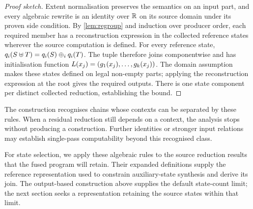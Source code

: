 \begin{proof}[Proof sketch]
Extent normalisation preserves the semantics on an input part, and every algebraic rewrite is an identity over $\mathbb{R}$ on its source domain under its proven side condition.
By \cref{lem:regroup} and induction over producer order, each required member has a reconstruction expression in the collected reference states wherever the source computation is defined.
For every reference state, $q_i(S\uplus T)=q_i(S)\oplus_i q_i(T)$.
The tuple therefore joins componentwise and has initialisation function $L(x_j)=(g_1(x_j),\dots,g_k(x_j))$.
The domain assumption makes these states defined on legal non-empty parts; applying the reconstruction expression at the root gives the required outputs.
There is one state component per distinct collected reduction, establishing the bound.
\end{proof}

The construction recognises chains whose contexts can be separated by these rules.
When a residual reduction still depends on a context, the analysis stops without producing a construction.
Further identities or stronger input relations may establish single-pass computability beyond this recognised class.

For state selection, we apply these algebraic rules to the source reduction results that the fused program will retain.
Their expanded definitions supply the reference representation used to constrain auxiliary-state synthesis and derive its join.
The output-based construction above supplies the default state-count limit; the next section seeks a representation retaining the source states within that limit.
